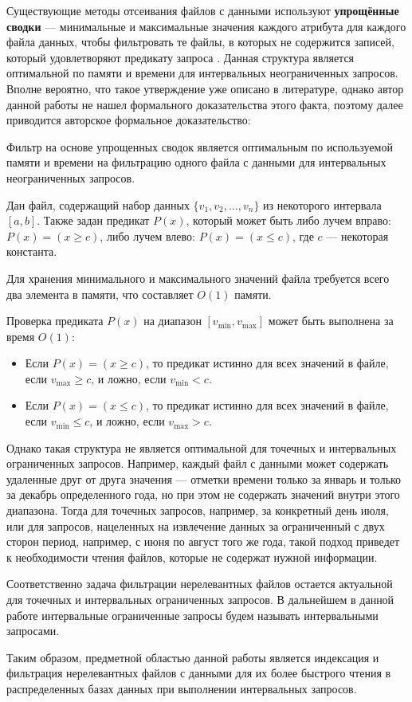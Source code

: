 Существующие методы отсеивания файлов с данными используют \textbf{упрощённые сводки} --- минимальные и максимальные значения каждого атрибута для каждого файла данных, чтобы фильтровать те файлы, в которых не содержится записей, который удовлетворяют предикату запроса \cite{Extensible_data_skipping, Small_Materialized_Aggregates}. Данная структура является оптимальной по памяти и времени для интервальных неограниченных запросов. Вполне вероятно, что такое утверждение уже описано в литературе, однако автор данной работы не нашел формального доказательства этого факта, поэтому далее приводится авторское формальное доказательство:
\begin{theorem} \label{theorema}
    Фильтр на основе упрощенных сводок является оптимальным по используемой памяти и времени на фильтрацию одного файла с данными для интервальных неограниченных запросов.
\end{theorem}
\proof

Дан файл, содержащий набор данных $\{v_1, v_2, \ldots, v_n\}$ из некоторого интервала $[a, b]$. Также задан предикат $P(x)$, который может быть либо лучем вправо: $P(x) = (x \geq c)$, либо лучем влево: $P(x) = (x \leq c)$, где $c$ — некоторая константа.

Для хранения минимального и максимального значений файла требуется всего два элемента в памяти, что составляет $O(1)$ памяти.

Проверка предиката $P(x)$ на диапазон $[v_{\min}, v_{\max}]$ может быть выполнена за время $O(1)$:
\begin{itemize}
    \item Если $P(x) = (x \geq c)$, то предикат истинно для всех значений в файле, если $v_{\max} \geq c$, и ложно, если $v_{\min} < c$.
    \item Если $P(x) = (x \leq c)$, то предикат истинно для всех значений в файле, если $v_{\min} \leq c$, и ложно, если $v_{\max} > c$.
\end{itemize}
\thmp

Однако такая структура не является оптимальной для точечных и интервальных ограниченных запросов. Например, каждый файл с данными может содержать удаленные друг от друга значения --- отметки времени только за январь и только за декабрь определенного года, но при этом не содержать значений внутри этого диапазона. Тогда для точечных запросов, например, за конкретный день июля, или для запросов, нацеленных на извлечение данных за ограниченный с двух сторон период, например, с июня по август того же года, такой подход приведет к необходимости чтения файлов, которые не содержат нужной информации.

Соответственно задача фильтрации нерелевантных файлов остается актуальной для точечных и интервальных ограниченных запросов. В дальнейшем в данной работе интервальные ограниченные запросы будем называть интервальными запросами.

Таким образом, предметной областью данной работы является индексация и фильтрация нерелевантных файлов с данными для их более быстрого чтения в распределенных базах данных при выполнении интервальных запросов.
